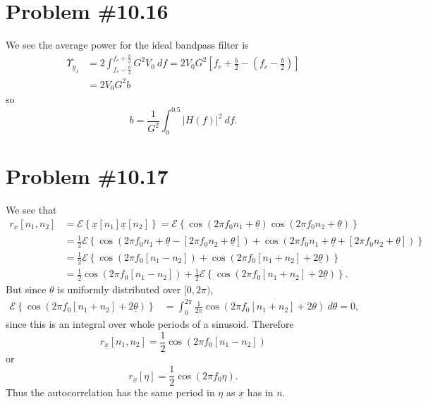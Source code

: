 \documentclass{article}
\begin{document}
\section*{Problem \#10.16}
We see the average power for the ideal bandpass filter is
\begin{align*}
\Upsilon_{\underline{y}_I} 
  &= 2\int_{f_c - \frac{b}{2}}^{f_c + \frac{b}{2}} G^2 V_0 ~df
          = 2V_0G^2 \left[f_c + \frac{b}{2} 
                        - \left(f_c - \frac{b}{2}\right)\right] \\
         &= 2V_0 G^2 b
\end{align*}
so
$$
b = \frac{1}{G^2} \int_{0}^{0.5} |H(f)|^2 ~df.
$$

\section*{Problem \#10.17}
We see that
\begin{align*}
r_{\underline{x}}[n_1, n_2] 
  &= \mathcal{E}\left\{\underline{x}[n_1]\underline{x}[n_2]\right\}
   = \mathcal{E}\left\{\cos(2 \pi f_0 n_1 + \underline{\theta})
                       \cos(2 \pi f_0 n_2 + \underline{\theta})\right\} \\
  &= \frac{1}{2}\mathcal{E}\left\{
       \cos(2 \pi f_0 n_1 + \underline{\theta} 
        - [2 \pi f_0 n_2 + \underline{\theta}])
     + \cos(2 \pi f_0 n_1 + \underline{\theta}
        + [2 \pi f_0 n_2 + \underline{\theta}])\right\} \\
  &= \frac{1}{2}\mathcal{E}\left\{
       \cos(2 \pi f_0 [n_1 - n_2]) 
     + \cos(2 \pi f_0 [n_1 + n_2] + 2\underline{\theta})\right\} \\
  &= \frac{1}{2} \cos (2 \pi f_0 [n_1 - n_2])
   + \frac{1}{2} \mathcal{E}\left\{
       \cos (2 \pi f_0 [n_1 + n_2] + 2\underline{\theta})\right\}.
\end{align*}
But since $\underline{\theta}$ is uniformly distributed over $[0, 2\pi)$,
\begin{align*}
\mathcal{E}\left\{\cos(2 \pi f_0 [n_1 + n_2] + 2\underline{\theta})\right\}
 &= \int_{0}^{2\pi} \frac{1}{2 \pi} 
      \cos(2 \pi f_0 [n_1 + n_2] + 2\theta) ~d\theta = 0,
\end{align*}
since this is an integral over whole periods of a sinusoid. Therefore
$$
r_{\underline{x}}[n_1, n_2] = \frac{1}{2} \cos (2 \pi f_0 [n_1 - n_2])
$$
or
$$
r_{\underline{x}}[\eta] = \frac{1}{2} \cos (2 \pi f_0 \eta).
$$
Thus the autocorrelation has the same period in $\eta$ as $\underline{x}$
has in $n$.
\end{document}
